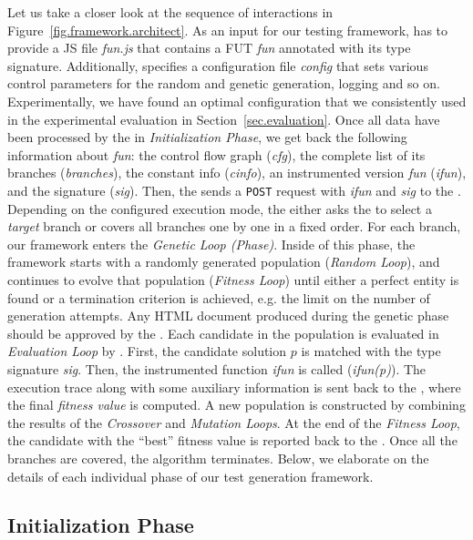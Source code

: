 Let us take a closer look at the sequence of interactions in Figure~\ref{fig.framework.architect}. As an input for our testing framework, \User has to provide a JS file \emph{fun.js} that contains a FUT \emph{fun} annotated with its type signature. Additionally, \User specifies a configuration file \emph{config} that sets various control parameters for the random and genetic generation, logging and so on. Experimentally, we have found an optimal configuration that we consistently used in the experimental evaluation in Section~\ref{sec.evaluation}. Once all data have been processed by the \Server in \emph{Initialization Phase}, we get back the following information about \emph{fun}: the control flow graph (\emph{cfg}), the complete list of its branches (\emph{branches}), the constant info (\emph{cinfo}), an instrumented version \emph{fun} (\emph{ifun}), and the signature (\emph{sig}). Then, the \Server sends a \texttt{POST} request with \emph{ifun} and \emph{sig} to the \Client. Depending on the configured execution mode, the \Server either asks the \User to select a \emph{target} branch or covers all branches one by one in a fixed order. For each branch, our framework enters the \emph{Genetic Loop (Phase)}. Inside of this phase, the framework starts with a randomly generated population (\emph{Random Loop}), and continues to evolve that population (\emph{Fitness Loop}) until either a perfect entity is found or a termination criterion is achieved, e.g. the limit on the number of generation attempts. Any HTML document produced during the genetic phase should be approved by the \Validator. Each candidate in the population is evaluated in \emph{Evaluation Loop} by \Client. First, the candidate solution $p$ is matched with the type signature \emph{sig}. Then, the instrumented function \emph{ifun} is called (\emph{ifun(p)}). The execution trace along with some auxiliary information is sent back to the \Server, where the final \emph{fitness value} is computed. A new population is constructed by combining the results of the \emph{Crossover} and \emph{Mutation Loops}. At the end of the \emph{Fitness Loop}, the candidate with the ``best'' fitness value is reported back to the \User. Once all the branches are covered, the algorithm terminates. Below, we elaborate on the details of each individual phase of our test generation framework.

\subsection{Initialization Phase}
\label{sub.sec.init.phase}

